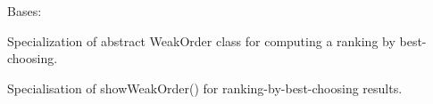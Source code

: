 \documentclass[letterpaper,10pt,english]{sphinxmanual}
\begin{document}
\begin{fulllineitems}
\label{techDoc:weakOrders.RankingByBestChoosingDigraph}
Bases: {\hyperref[techDoc:weakOrders.RankingByChoosingDigraph]{\emph{}}}

Specialization of abstract WeakOrder class for computing a ranking by best-choosing.

\begin{fulllineitems}
\label{techDoc:weakOrders.RankingByBestChoosingDigraph.showWeakOrder}
Specialisation of showWeakOrder() for ranking-by-best-choosing results.

\end{fulllineitems}


\end{fulllineitems}

\end{document}
